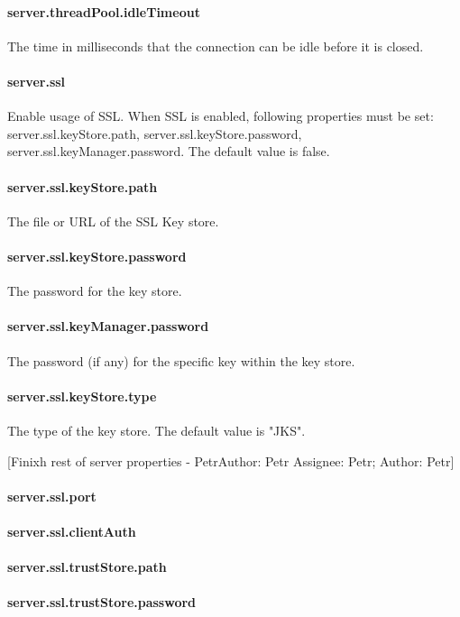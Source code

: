 \documentclass[12pt,a4paper]{report}
\makeatletter
\newcommand{\comment}[3][\@empty]{
  {\color{magenta}[#3 - }
  {\color{green}\ifx\@empty#1\relax Author: #2 \else Assignee: #1; Author: #2\fi}{\color{magenta}]}
}
\makeatother
\begin{document}
\paragraph{server.threadPool.idleTimeout}
The time in milliseconds that the connection can be idle before it is closed.

\paragraph{server.ssl}
Enable usage of SSL. When SSL is enabled, following properties must be set:
server.ssl.keyStore.path, server.ssl.keyStore.password, server.ssl.keyManager.password.
The default value is false.

\paragraph{server.ssl.keyStore.path}
The file or URL of the SSL Key store.
\paragraph{server.ssl.keyStore.password}
The password for the key store.
\paragraph{server.ssl.keyManager.password}
The password (if any) for the specific key within the key store.
\paragraph{server.ssl.keyStore.type}
The type of the key store. The default value is "JKS".

\comment[Petr]{Petr}{Finixh rest of server properties}
\paragraph{server.ssl.port}

\paragraph{server.ssl.clientAuth}
\paragraph{server.ssl.trustStore.path}
\paragraph{server.ssl.trustStore.password}
\end{document}
